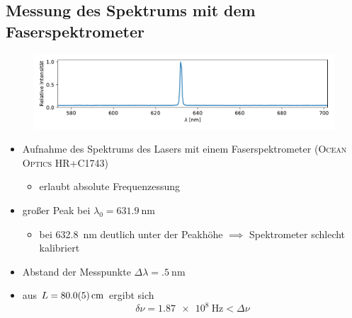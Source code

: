 \documentclass[10pt, aspectratio=169]{beamer}
\begin{document}
\subsection{Messung des Spektrums mit dem Faserspektrometer}
\begin{frame}
  \begin{figure}
    \includegraphics[width=1\columnwidth]{figs/faserspek.pdf}
  \end{figure}
  \begin{itemize}
  \item<1-> Aufnahme des Spektrums des Lasers mit einem
    Faserspektrometer (\textsc{Ocean Optics HR+C1743})
    \begin{itemize}
    \item erlaubt absolute Frequenzessung
    \end{itemize}
  \item<2-> gro\ss{}er Peak bei \(\lambda_0=\SI{631.9}{\nano\meter}\)
    \begin{itemize}
    \item<3-> bei \SI{632.8}{\nano\meter} deutlich unter der
      Peakh\"ohe \(\implies\) Spektrometer schlecht kalibriert
    \end{itemize}
  \end{itemize}
\end{frame}

\begin{frame}
  \begin{itemize}
  \item<1-> Abstand der Messpunkte
    \(\Delta\lambda=\SI{.5}{\nano\meter}\) 
  \item<3-> aus \(L=\SI{80+-.5}{\centi\meter}\) ergibt sich
    \begin{equation}
      \label{eq:moda}
      \delta\nu = \SI{1.87e8}{\hertz} < \Delta\nu
    \end{equation}
  \end{itemize}
\end{frame}
\end{document}
